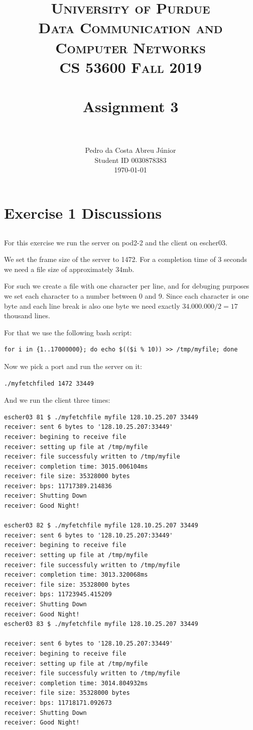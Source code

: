 \documentclass[paper=a4, fontsize=11pt]{scrartcl}
\title{
		\usefont{OT1}{bch}{b}{n}
		\normalfont \normalsize \textsc{University of Purdue\\
      Data Communication and Computer Networks\\
      CS 53600 Fall 2019} \\ [25pt]
		\horrule{0.5pt} \\[0.4cm]
		\huge Assignment 3\\
		\horrule{2pt} \\[0.5cm]
}
\author{
		\normalfont\normalsize Pedro da Costa Abreu Júnior\\ [-5pt]
    \normalsize Student ID 0030878383\\[-5pt]
    \normalsize \today
}
\date{}
\numberwithin{equation}{section}		%
\numberwithin{figure}{section}			%
\numberwithin{table}{section}				%
\begin{document}
\maketitle

\section{Exercise 1 Discussions}
\subsection{}
For this exercise we run the server on pod2-2 and the client on
escher03.

We set the frame size of the server to 1472. For a completion
time of 3 seconds we need a file size of approximately 34mb.

For such we create a file with one character per line,
and for debuging purposes we set each character to a number between
0 and 9. Since each character is one byte and each line break
is also one byte we need exactly $34.000.000 / 2 = 17$ thousand lines.

For that we use the following bash script:

\begin{verbatim}
for i in {1..17000000}; do echo $(($i % 10)) >> /tmp/myfile; done
\end{verbatim}

Now we pick a port and run the server on it:

\begin{verbatim}
./myfetchfiled 1472 33449
\end{verbatim}

And we run the client three times:

\begin{verbatim}
escher03 81 $ ./myfetchfile myfile 128.10.25.207 33449
receiver: sent 6 bytes to '128.10.25.207:33449'
receiver: begining to receive file
receiver: setting up file at /tmp/myfile
receiver: file successfuly written to /tmp/myfile
receiver: completion time: 3015.006104ms
receiver: file size: 35328000 bytes
receiver: bps: 11717389.214836
receiver: Shutting Down
receiver: Good Night!

escher03 82 $ ./myfetchfile myfile 128.10.25.207 33449
receiver: sent 6 bytes to '128.10.25.207:33449'
receiver: begining to receive file
receiver: setting up file at /tmp/myfile
receiver: file successfuly written to /tmp/myfile
receiver: completion time: 3013.320068ms
receiver: file size: 35328000 bytes
receiver: bps: 11723945.415209
receiver: Shutting Down
receiver: Good Night!
escher03 83 $ ./myfetchfile myfile 128.10.25.207 33449

receiver: sent 6 bytes to '128.10.25.207:33449'
receiver: begining to receive file
receiver: setting up file at /tmp/myfile
receiver: file successfuly written to /tmp/myfile
receiver: completion time: 3014.804932ms
receiver: file size: 35328000 bytes
receiver: bps: 11718171.092673
receiver: Shutting Down
receiver: Good Night!
\end{verbatim}
\end{document}
